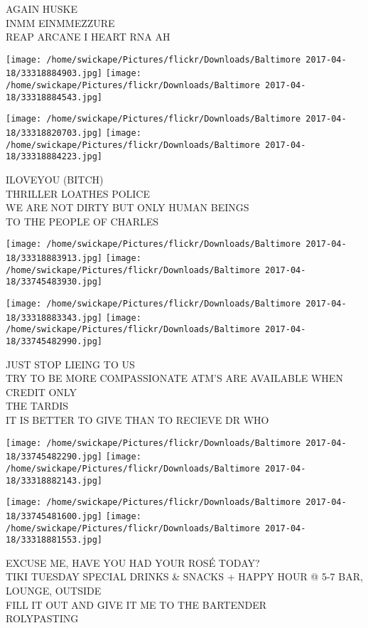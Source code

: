 \documentclass[10pt,letterpaper]{article}
\begin{document}
AGAIN HUSKE\\
INMM EINMMEZZURE\\
REAP ARCANE I HEART RNA AH
\pagebreak

\texttt{[image: /home/swickape/Pictures/flickr/Downloads/Baltimore 2017-04-18/33318884903.jpg]}
\texttt{[image: /home/swickape/Pictures/flickr/Downloads/Baltimore 2017-04-18/33318884543.jpg]}

\texttt{[image: /home/swickape/Pictures/flickr/Downloads/Baltimore 2017-04-18/33318820703.jpg]}
\texttt{[image: /home/swickape/Pictures/flickr/Downloads/Baltimore 2017-04-18/33318884223.jpg]}

ILOVEYOU (BITCH)\\
THRILLER LOATHES POLICE\\
WE ARE NOT DIRTY BUT ONLY HUMAN BEINGS\\
TO THE PEOPLE OF CHARLES
\pagebreak

\texttt{[image: /home/swickape/Pictures/flickr/Downloads/Baltimore 2017-04-18/33318883913.jpg]}
\texttt{[image: /home/swickape/Pictures/flickr/Downloads/Baltimore 2017-04-18/33745483930.jpg]}

\texttt{[image: /home/swickape/Pictures/flickr/Downloads/Baltimore 2017-04-18/33318883343.jpg]}
\texttt{[image: /home/swickape/Pictures/flickr/Downloads/Baltimore 2017-04-18/33745482990.jpg]}

JUST STOP LIEING TO US\\
TRY TO BE MORE COMPASSIONATE ATM'S ARE AVAILABLE WHEN CREDIT ONLY\\
THE TARDIS\\
IT IS BETTER TO GIVE THAN TO RECIEVE DR WHO
\pagebreak

\texttt{[image: /home/swickape/Pictures/flickr/Downloads/Baltimore 2017-04-18/33745482290.jpg]}
\texttt{[image: /home/swickape/Pictures/flickr/Downloads/Baltimore 2017-04-18/33318882143.jpg]}

\texttt{[image: /home/swickape/Pictures/flickr/Downloads/Baltimore 2017-04-18/33745481600.jpg]}
\texttt{[image: /home/swickape/Pictures/flickr/Downloads/Baltimore 2017-04-18/33318881553.jpg]}

EXCUSE ME, HAVE YOU HAD YOUR ROSÉ TODAY?\\
TIKI TUESDAY SPECIAL DRINKS \& SNACKS + HAPPY HOUR @ 5{-}7 BAR, LOUNGE, OUTSIDE\\
FILL IT OUT AND GIVE IT ME TO THE BARTENDER\\
ROLYPASTING
\pagebreak
\end{document}
